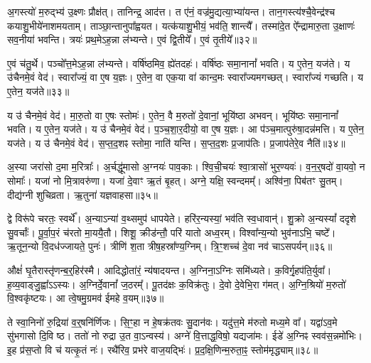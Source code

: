अ॒गस्त्यो॑ म॒रुद्भ्य॑ उ॒क्ष्णः प्रौक्ष॑त्।
तानिन्द्र॒ आद॑त्त।
त ए॑नं॒ वज्र॑मु॒द्यत्या॒भ्या॑यन्त।
तान॒गस्त्य॑श्चै॒वेन्द्र॑श्च कयाशु॒भीये॑नाशमयताम्।
ताञ्छा॒न्तानुपा᳚ह्वयत।
यत्क॑याशु॒भीयं॒ भव॑ति॒ शान्त्यै᳚।
तस्मा॑दे॒त ऐ᳚न्द्रामारु॒ता उ॒क्षाणः॑ सव॒नीया॑ भवन्ति।
त्रयः॑ प्रथ॒मे\-ऽह॒न्ना ल॑भ्यन्ते।
ए॒वं द्वि॒तीये᳚।
ए॒वं तृ॒तीये᳚॥३२॥\ip

ए॒वं च॑तु॒र्थे।
पञ्चो᳚त्त॒मे\-ऽह॒न्ना ल॑भ्यन्ते।
वर्\mbox{}षि॑ष्ठमिव॒ ह्ये॑तदहः॑।
वर्\mbox{}षि॑ष्ठः समा॒नानां᳚ भवति।
य ए॒तेन॒ यज॑ते।
य उ॑चैनमे॒वं वेद॑।
स्वारा᳚ज्यं॒ वा ए॒ष य॒ज्ञः।
ए॒तेन॒ वा एक॒या वा॑ कान्द॒मः स्वारा᳚ज्यमगच्छत्।
स्वारा᳚ज्यं गच्छति।
य ए॒तेन॒ यज॑ते॥३३॥\ip

य उ॑ चैनमे॒वं वेद॑।
मा॒रु॒तो वा ए॒षः स्तोमः॑।
ए॒तेन॒ वै म॒रुतो॑ दे॒वानां॒ भूयि॑ष्ठा अभवन्।
भूयि॑ष्ठः समा॒नानां᳚ भवति।
य ए॒तेन॒ यज॑ते।
य उ॑ चैनमे॒वं वेद॑।
प॒ञ्च॒शा॒र॒दीयो॒ वा ए॒ष य॒ज्ञः।
आ प॑ञ्च॒मात्पुरु॑षा॒दन्न॑मत्ति।
य ए॒तेन॒ यज॑ते।
य उ॑ चैनमे॒वं वेद॑।
स॒प्त॒द॒शꣴ स्तोमा॒ नाति॑ यन्ति।
स॒प्त॒द॒शः प्र॒जा\-प॑तिः।
प्र॒जा\-प॑तेरे॒व नैति॑॥३४॥\ip\anuvakamend[तृ॒तीये॑ गच्छति॒ य ए॒तेन॒ यज॑ते\-ऽत्ति॒ य ए॒तेन॒ यज॑ते॒ य उ॑ चैनमे॒वं वेद॒ त्रीणि॑ च (अ॒गस्त्यः॒ स्वारा᳚ज्यं मारु॒तः प॑ञ्चशार॒दीयो॒ वा ए॒ष य॒ज्ञः स॑प्तद॒शं प्र॒जा\-प॑तेरे॒व नैति॑॥)]

अ॒स्या जरा॑सो द॒मा म॒रित्राः᳚।
अ॒र्चद्धू॑मासो अ॒ग्नयः॑ पाव॒काः।
श्वि॒ची॒चयः॑ श्वा॒त्रासो॑ भुर॒ण्यवः॑।
व॒न॒र्॒षदो॑ वा॒यवो॒ न सोमाः᳚।
यजा॑ नो मि॒त्रावरु॑णा।
यजा॑ दे॒वाꣳ ऋ॒तं बृ॒हत्।
अग्ने॒ यक्षि॒ स्वन्दमम्᳚।
अश्वि॑ना॒ पिब॑तꣳ सु॒तम्।
दीद्य॑ग्नी शुचिव्रता।
ऋ॒तुना॑ यज्ञवाहसा॥३५॥\ip

द्वे विरू॑पे चरतः॒ स्वर्थे᳚।
अ॒न्या\-ऽन्या॑ व॒थ्समुप॑ धापयेते।
हरि॑र॒न्यस्यां॒ भव॑ति स्व॒धावान्॑।
शु॒क्रो अ॒न्यस्यां᳚ ददृशे सु॒वर्चाः᳚।
पू॒र्वा॒प॒रं च॑रतो मा॒ययै॒तौ।
शिशू॒ क्रीड॑न्तौ॒ परि॑ यातो अध्व॒रम्।
विश्वा᳚न्य॒न्यो भुव॑नाऽभि॒ चष्टे᳚।
ऋ॒तून॒न्यो वि॒दध॑ज्जायते॒ पुनः॑।
त्रीणि॑ श॒ता त्रीष॒हस्रा᳚ण्य॒ग्निम्।
त्रि॒ꣳ॒शच्च॑ दे॒वा नव॑ चाऽसपर्यन्॥३६॥\ip

औक्षं॑ घृ॒तैरास्तृ॑णन्ब॒र्॒हिर॑स्मै।
आदिद्धोता॑रं॒ न्य॑षादयन्त।
अ॒ग्निना॒\-ऽग्निः समि॑ध्यते।
क॒विर्गृ॒हप॑ति॒र्युवा᳚।
ह॒व्य॒वाड्जु॒ह्वा᳚ऽऽस्यः।
अ॒ग्निर्दे॒वानां᳚ ज॒ठरम्᳚।
पू॒तद॑क्षः क॒विक्र॑तुः।
दे॒वो दे॒वेभि॒रा ग॑मत्।
अ॒ग्नि॒श्रियो॑ म॒रुतो॑ वि॒श्वकृ॑ष्टयः।
आ त्वे॒षमु॒ग्रमव॑ ईमहे व॒यम्॥३७॥\ip

ते स्वा॒निनो॑ रु॒द्रिया॑ व॒र्॒षनि॑र्णिजः।
सि॒ꣳ॒हा न हे॒षक्र॑तवः सु॒दान॑वः।
यदु॑त्त॒मे म॑रुतो मध्य॒मे वा᳚।
यद्वा॑\-ऽव॒मे सु॑भगासो दि॒वि ष्ठ।
ततो॑ नो रुद्रा उ॒त वा॒\-ऽन्वस्य॑।
अग्ने॑ वि॒त्ताद्ध॒विषो॒ यद्यजा॑मः।
ईडे॑ अ॒ग्निꣴ स्वव॑स॒न्नमो॑भिः।
इ॒ह प्र॑स॒प्तो वि च॑ यत्कृ॒तं नः॑।
रथै॑रिव॒ प्रभ॑रे वाज॒यद्भिः॑।
प्र॒द॒क्षि॒णिन्म॒रुता॒ꣴ॒ स्तोम॑मृद्ध्याम्॥३८॥\ip

